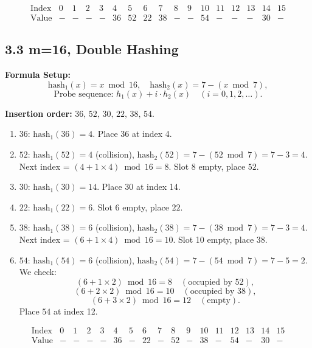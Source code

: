 \documentclass[12pt]{article}
\begin{document}
	\[
	\begin{array}{c|cccccccccccccccc}
		\text{Index} & 0 & 1 & 2 & 3 & 4 & 5 & 6 & 7 & 8 & 9 & 10 & 11 & 12 & 13 & 14 & 15 \\
		\hline
		\text{Value} & - & - & - & - & 36 & 52 & 22 & 38 & - & - & 54 & - & - & - & 30 & -
	\end{array}
	\]
	
	\subsection*{3.3 m=16, Double Hashing}
	\noindent
	\textbf{Formula Setup:} 
	\[
	\text{hash}_1(x) = x \bmod 16, 
	\quad
	\text{hash}_2(x) = 7 - (x \bmod 7),
	\]
	\[
	\text{Probe sequence: } h_1(x) + i \cdot h_2(x) \quad (i = 0,1,2,\dots).
	\]
	
	\noindent
	\textbf{Insertion order:} \(36,\,52,\,30,\,22,\,38,\,54\). 
	\begin{enumerate}
		\item \(36\): 
		\(\text{hash}_1(36) = 4\). 
		Place \(36\) at index 4.
		\item \(52\): 
		\(\text{hash}_1(52) = 4\) (collision), 
		\(\text{hash}_2(52) = 7 - (52 \bmod 7) = 7 - 3 = 4.\)
		Next index = \((4 + 1\times 4) \bmod 16 = 8.\) Slot 8 empty, place \(52\).
		\item \(30\): 
		\(\text{hash}_1(30) = 14\). 
		Place \(30\) at index 14.
		\item \(22\): 
		\(\text{hash}_1(22) = 6\). 
		Slot 6 empty, place \(22\).
		\item \(38\): 
		\(\text{hash}_1(38) = 6\) (collision), 
		\(\text{hash}_2(38) = 7 - (38 \bmod 7) = 7 - 3 = 4.\)
		Next index = \((6 + 1\times 4) \bmod 16 = 10.\) Slot 10 empty, place \(38\).
		\item \(54\): 
		\(\text{hash}_1(54) = 6\) (collision), 
		\(\text{hash}_2(54) = 7 - (54 \bmod 7) = 7 - 5 = 2.\)
		We check:
		\[
		(6 + 1\times 2) \bmod 16 = 8 \quad (\text{occupied by }52),
		\]
		\[
		(6 + 2\times 2) \bmod 16 = 10 \quad (\text{occupied by }38),
		\]
		\[
		(6 + 3\times 2) \bmod 16 = 12 \quad (\text{empty}).
		\]
		Place \(54\) at index 12.
	\end{enumerate}
	
	\[
	\begin{array}{c|cccccccccccccccc}
		\text{Index} & 0 & 1 & 2 & 3 & 4 & 5 & 6 & 7 & 8 & 9 & 10 & 11 & 12 & 13 & 14 & 15 \\
		\hline
		\text{Value} & - & - & - & - & 36 & - & 22 & - & 52 & - & 38 & - & 54 & - & 30 & -
	\end{array}
	\]
	
\end{document}
